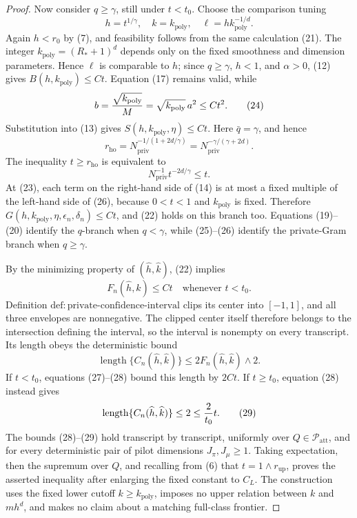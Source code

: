 \documentclass{article}
\begin{document}
\begin{proof}
Now consider \(q\ge\gamma\), still under \(t<t_0\).  Choose the comparison tuning
\[
 h=t^{1/\gamma},\quad k=k_{\mathrm{poly}},
 \quad \ell=hk_{\mathrm{poly}}^{-1/d}.
\tag{23}
\]
Again \(h<r_0\) by (7), and feasibility follows from the same calculation (21).  The integer \(k_{\mathrm{poly}}=(R_*+1)^d\) depends only on the fixed smoothness and dimension parameters.  Hence \(\ell\) is comparable to \(h\); since \(q\ge\gamma\), \(h<1\), and \(\alpha>0\), (12) gives \(B(h,k_{\mathrm{poly}})\le Ct\).  Equation (17) remains valid, while
\[
 b={\sqrt{k_{\mathrm{poly}}}\over M}
   =\sqrt{k_{\mathrm{poly}}}\,a^2\le Ct^2.
\tag{24}
\]
Substitution into (13) gives \(S(h,k_{\mathrm{poly}},\eta)\le Ct\).  Here \(\bar q=\gamma\), and hence
\[
 r_{\mathrm{ho}}
 =N_{\mathrm{priv}}^{-1/(1+2d/\gamma)}
 =N_{\mathrm{priv}}^{-\gamma/(\gamma+2d)}.
\tag{25}
\]
The inequality \(t\ge r_{\mathrm{ho}}\) is equivalent to
\[
 N_{\mathrm{priv}}^{-1}t^{-2d/\gamma}\le t.
\tag{26}
\]
At (23), each term on the right-hand side of (14) is at most a fixed multiple of the left-hand side of (26), because \(0<t<1\) and \(k_{\mathrm{poly}}\) is fixed.  Therefore \(G(h,k_{\mathrm{poly}},\eta,\epsilon_n,\delta_n)\le Ct\), and (22) holds on this branch too.  Equations (19)--(20) identify the \(q\)-branch when \(q<\gamma\), while (25)--(26) identify the private-Gram branch when \(q\ge\gamma\).

By the minimizing property of \((\widehat h,\widehat k)\), (22) implies
\[
 F_n(\widehat h,\widehat k)\le Ct
 \quad\text{whenever }t<t_0.
\tag{27}
\]
Definition \(\mathrm{def{:}private\text{-}confidence\text{-}interval}\) clips its center into \([-1,1]\), and all three envelopes are nonnegative.  The clipped center itself therefore belongs to the intersection defining the interval, so the interval is nonempty on every transcript.  Its length obeys the deterministic bound
\[
 \operatorname{length}\{C_n(\widehat h,\widehat k)\}
 \le 2F_n(\widehat h,\widehat k)\wedge2.
\tag{28}
\]
If \(t<t_0\), equations (27)--(28) bound this length by \(2Ct\).  If \(t\ge t_0\), equation (28) instead gives
\[
 \operatorname{length}\{C_n(\widehat h,\widehat k)\}
 \le2\le {2\over t_0}t.
\tag{29}
\]
The bounds (28)--(29) hold transcript by transcript, uniformly over \(Q\in\mathcal P_{\mathrm{att}}\), and for every deterministic pair of pilot dimensions \(J_\pi,J_\mu\ge1\).  Taking expectation, then the supremum over \(Q\), and recalling from (6) that \(t=1\wedge r_{\mathrm{up}}\), proves the asserted inequality after enlarging the fixed constant to \(C_L\).  The construction uses the fixed lower cutoff \(k\ge k_{\mathrm{poly}}\), imposes no upper relation between \(k\) and \(mh^d\), and makes no claim about a matching full-class frontier.
\end{proof}
\end{document}
